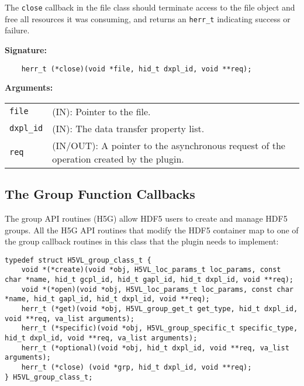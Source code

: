 %
%
%

The {\tt close} callback in the file class should terminate access to
the file object and free all resources it was consuming, and returns
an {\tt herr\_t} indicating success or failure.

\textbf{Signature:}
\begin{lstlisting}
    herr_t (*close)(void *file, hid_t dxpl_id, void **req);
\end{lstlisting}

\textbf{Arguments:}\\
\begin{tabular}{l p{10cm}}
  {\tt file} & (IN): Pointer to the file.\\
  {\tt dxpl\_id} & (IN): The data transfer property list.\\
  {\tt req} & (IN/OUT): A pointer to the asynchronous request of the
  operation created by the plugin.\\
\end{tabular}

\subsection{The Group Function Callbacks}
The group API routines (H5G) allow HDF5 users to create and manage
HDF5 groups. All the H5G API routines that modify the HDF5 container
map to one of the group callback routines in this class that the
plugin needs to implement:

\begin{lstlisting}
typedef struct H5VL_group_class_t {
    void *(*create)(void *obj, H5VL_loc_params_t loc_params, const char *name, hid_t gcpl_id, hid_t gapl_id, hid_t dxpl_id, void **req);
    void *(*open)(void *obj, H5VL_loc_params_t loc_params, const char *name, hid_t gapl_id, hid_t dxpl_id, void **req);
    herr_t (*get)(void *obj, H5VL_group_get_t get_type, hid_t dxpl_id, void **req, va_list arguments);
    herr_t (*specific)(void *obj, H5VL_group_specific_t specific_type, hid_t dxpl_id, void **req, va_list arguments);
    herr_t (*optional)(void *obj, hid_t dxpl_id, void **req, va_list arguments);
    herr_t (*close) (void *grp, hid_t dxpl_id, void **req);
} H5VL_group_class_t;
\end{lstlisting}


